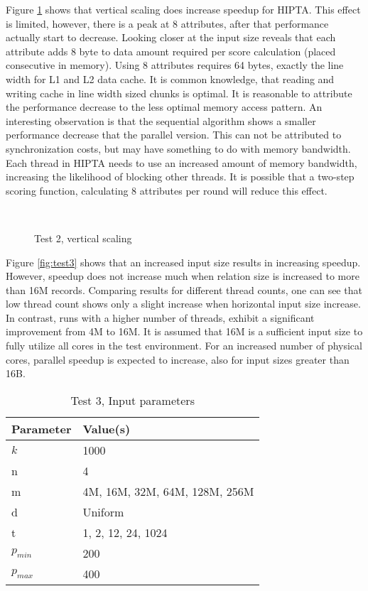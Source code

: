 Figure \ref{fig:test2} shows that vertical scaling does increase
speedup for HIPTA. This effect is limited, however, there is a peak at
8 attributes, after that performance actually start to decrease.
Looking closer at the input size reveals that each attribute adds 8
byte to data amount required per score calculation (placed consecutive
in memory). Using 8 attributes requires 64 bytes, exactly the line
width for L1 and L2 data cache. It is common knowledge, that reading
and writing cache in line width sized chunks is optimal. It is
reasonable to attribute the performance decrease to the less optimal
memory access pattern. An interesting observation is that the
sequential algorithm shows a smaller performance decrease that the
parallel version. This can not be attributed to synchronization costs,
but may have something to do with memory bandwidth. Each thread in
HIPTA needs to use an increased amount of memory bandwidth, increasing
the likelihood of blocking other threads. It is possible that a
two-step scoring function, calculating 8 attributes per round will
reduce this effect.

\begin{figure}[H] 
\centering 
{} \qquad
{} \\
 \qquad
{} 
\caption{Test 2, vertical scaling} 
\label{fig:test2} 
\end{figure}

Figure \ref{fig:test3} shows that an increased input size results in
increasing speedup. However, speedup does not increase much when
relation size is increased to more than 16M records. Comparing results
for different thread counts, one can see that low thread count shows
only a slight increase when horizontal input size increase. In
contrast, runs with a higher number of threads, exhibit a
significant improvement from 4M to 16M. It is assumed that 16M is
a sufficient input size to fully utilize all cores in the test
environment. For an increased number of physical cores, parallel
speedup is expected to increase, also for input sizes greater than 16B.

\begin{table}[H]
	\centering
	\begin{tabular}{|l|l|}
	\hline
	Parameter & Value(s) \\ \hline
	$k$ & 1000 \\
	n & 4\\
	m & 4M, 16M, 32M, 64M, 128M, 256M\\
	d & Uniform\\
	t & 1, 2, 12, 24, 1024\\
	$p_{min}$ & 200\\
	$p_{max}$ & 400 \\
	\hline
	\end{tabular}
	\caption{Test 3, Input parameters}
	\label{tab:test3-params}
\end{table}

